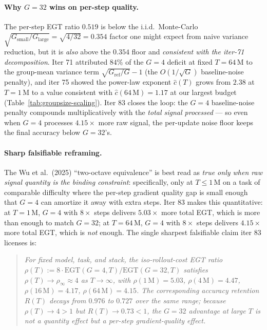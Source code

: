 \paragraph{Why $G{=}32$ wins on per-step quality.}
The per-step EGT ratio $0.519$ is below the i.i.d.\ Monte-Carlo
$\sqrt{G_{\mathrm{small}}/G_{\mathrm{large}}} = \sqrt{4/32} = 0.354$
factor one might expect from naive variance reduction, but it is
\emph{also} above the $0.354$ floor and \emph{consistent with the
iter-71 decomposition}.  Iter 71 attributed $84\%$ of the $G{=}4$
deficit at fixed $T{=}64\,\mathrm{M}$ to the group-mean variance term
$\sqrt{G_{\mathrm{ref}}/G} - 1$ (the $O(1/\sqrt{G})$ baseline-noise
penalty), and iter 75 showed the power-law exponent $\hat c(T)$ grows
from $2.38$ at $T{=}1\,\mathrm{M}$ to a value consistent with
$\hat c(64\,\mathrm{M}){=}1.17$ at our largest budget
(Table~\ref{tab:groupsize-scaling}).  Iter 83 closes the loop: the
$G{=}4$ baseline-noise penalty compounds multiplicatively with the
\emph{total signal processed} --- so even when $G{=}4$ processes
$4.15{\times}$ more raw signal, the per-update noise floor keeps the
final accuracy below $G{=}32$'s.

\paragraph{Sharp falsifiable reframing.}
The Wu et al.\ (2025) ``two-octave equivalence'' is best read as
\emph{true only when raw signal quantity is the binding constraint}:
specifically, only at $T \le 1\,\mathrm{M}$ on a task of comparable
difficulty where the per-step gradient quality gap is small enough that
$G{=}4$ can amortize it away with extra steps.  Iter 83 makes this
quantitative: at $T{=}1\,\mathrm{M}$, $G{=}4$ with $8{\times}$ steps
delivers $5.03{\times}$ more total EGT, which is more than enough to
match $G{=}32$; at $T{=}64\,\mathrm{M}$, $G{=}4$ with $8{\times}$
steps delivers $4.15{\times}$ more total EGT, which is \emph{not}
enough.  The single sharpest falsifiable claim iter 83 licenses is:

\begin{quote}
\emph{For fixed model, task, and stack, the iso-rollout-cost EGT ratio
$\rho(T) := 8 \cdot \mathrm{EGT}(G{=}4, T) / \mathrm{EGT}(G{=}32, T)$
satisfies $\rho(T) \to \rho_{\infty} \approx 4$ as $T \to \infty$,
with $\rho(1\,\mathrm{M}){=}5.03$, $\rho(4\,\mathrm{M}){=}4.47$,
$\rho(16\,\mathrm{M}){=}4.17$, $\rho(64\,\mathrm{M}){=}4.15$.  The
corresponding accuracy retention $R(T)$ decays from $0.976$ to $0.727$
over the same range; because $\rho(T) \to 4 > 1$ but $R(T) \to 0.73 <
1$, the $G{=}32$ advantage at large $T$ is not a quantity effect but
a per-step gradient-quality effect.}
\end{quote}


